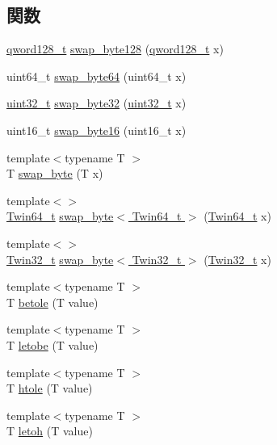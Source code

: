 \subsection*{関数}
\begin{DoxyCompactItemize}
\item 
\hyperlink{structqword128__t}{qword128\_\-t} \hyperlink{byteswap_8hh_a2d35467856f0684a26fd9a0a69f88456}{swap\_\-byte128} (\hyperlink{structqword128__t}{qword128\_\-t} x)
\item 
uint64\_\-t \hyperlink{byteswap_8hh_a967a7b2fbf5389735a64a247a9122822}{swap\_\-byte64} (uint64\_\-t x)
\item 
\hyperlink{Type_8hh_a435d1572bf3f880d55459d9805097f62}{uint32\_\-t} \hyperlink{byteswap_8hh_a22bec80aff1a93b99ca7974b6b72810d}{swap\_\-byte32} (\hyperlink{Type_8hh_a435d1572bf3f880d55459d9805097f62}{uint32\_\-t} x)
\item 
uint16\_\-t \hyperlink{byteswap_8hh_a657b67db48aed3619d03cb886d87cb03}{swap\_\-byte16} (uint16\_\-t x)
\item 
{\footnotesize template$<$typename T $>$ }\\T \hyperlink{byteswap_8hh_af9e70a6d5396cec8ae735b2fc330cdfb}{swap\_\-byte} (T x)
\item 
{\footnotesize template$<$$>$ }\\\hyperlink{structm5__twin64__t}{Twin64\_\-t} \hyperlink{byteswap_8hh_aed089e6a02d56dd35d6f651216ef9d1a}{swap\_\-byte$<$ Twin64\_\-t $>$} (\hyperlink{structm5__twin64__t}{Twin64\_\-t} x)
\item 
{\footnotesize template$<$$>$ }\\\hyperlink{structm5__twin32__t}{Twin32\_\-t} \hyperlink{byteswap_8hh_aced9dadb2c01690723d40d5b3a602776}{swap\_\-byte$<$ Twin32\_\-t $>$} (\hyperlink{structm5__twin32__t}{Twin32\_\-t} x)
\item 
{\footnotesize template$<$typename T $>$ }\\T \hyperlink{byteswap_8hh_a8406bc904f1bcbe3e7988be84d7713d3}{betole} (T value)
\item 
{\footnotesize template$<$typename T $>$ }\\T \hyperlink{byteswap_8hh_aa2254f32edd0ec0e197562f0e9f7029a}{letobe} (T value)
\item 
{\footnotesize template$<$typename T $>$ }\\T \hyperlink{byteswap_8hh_ac65420460fe8f6fd2a34e80843fc514a}{htole} (T value)
\item 
{\footnotesize template$<$typename T $>$ }\\T \hyperlink{byteswap_8hh_ab4fd5fcb5fd81289408dfd05adef6866}{letoh} (T value)

\end{DoxyCompactItemize}
